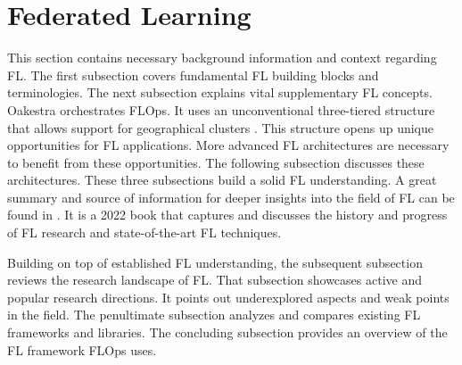 \section{Federated Learning}\label{section:federated_learning}

This section contains necessary background information and context regarding FL.
The first subsection covers fundamental FL building blocks and terminologies.
The next subsection explains vital supplementary FL concepts.
Oakestra orchestrates FLOps.
It uses an unconventional three-tiered structure that allows support for geographical clusters \cite{paper:oakestra_usenix}.
This structure opens up unique opportunities for FL applications.
More advanced FL architectures are necessary to benefit from these opportunities.
The following subsection discusses these architectures.
These three subsections build a solid FL understanding.
A great summary and source of information for deeper insights into the field of FL can be found in \cite{book:fl}.
It is a 2022 book that captures and discusses the history and progress of FL research and state-of-the-art FL techniques.

Building on top of established FL understanding, the subsequent subsection reviews the research landscape of FL.
That subsection showcases active and popular research directions.
It points out underexplored aspects and weak points in the field.
The penultimate subsection analyzes and compares existing FL frameworks and libraries.
The concluding subsection provides an overview of the FL framework FLOps uses.






